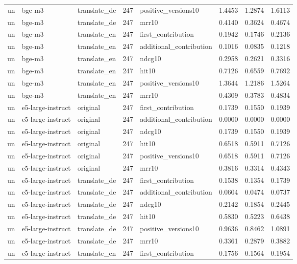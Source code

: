 \begin{tabular}{lllrlrrr}
un & bge-m3 & translate\_de & 247 & positive\_versions10 & 1.4453 & 1.2874 & 1.6113 \\
un & bge-m3 & translate\_de & 247 & mrr10 & 0.4140 & 0.3624 & 0.4674 \\
un & bge-m3 & translate\_en & 247 & first\_contribution & 0.1942 & 0.1746 & 0.2136 \\
un & bge-m3 & translate\_en & 247 & additional\_contribution & 0.1016 & 0.0835 & 0.1218 \\
un & bge-m3 & translate\_en & 247 & ndcg10 & 0.2958 & 0.2621 & 0.3316 \\
un & bge-m3 & translate\_en & 247 & hit10 & 0.7126 & 0.6559 & 0.7692 \\
un & bge-m3 & translate\_en & 247 & positive\_versions10 & 1.3644 & 1.2186 & 1.5264 \\
un & bge-m3 & translate\_en & 247 & mrr10 & 0.4309 & 0.3783 & 0.4834 \\
un & e5-large-instruct & original & 247 & first\_contribution & 0.1739 & 0.1550 & 0.1939 \\
un & e5-large-instruct & original & 247 & additional\_contribution & 0.0000 & 0.0000 & 0.0000 \\
un & e5-large-instruct & original & 247 & ndcg10 & 0.1739 & 0.1550 & 0.1939 \\
un & e5-large-instruct & original & 247 & hit10 & 0.6518 & 0.5911 & 0.7126 \\
un & e5-large-instruct & original & 247 & positive\_versions10 & 0.6518 & 0.5911 & 0.7126 \\
un & e5-large-instruct & original & 247 & mrr10 & 0.3816 & 0.3314 & 0.4343 \\
un & e5-large-instruct & translate\_de & 247 & first\_contribution & 0.1538 & 0.1354 & 0.1739 \\
un & e5-large-instruct & translate\_de & 247 & additional\_contribution & 0.0604 & 0.0474 & 0.0737 \\
un & e5-large-instruct & translate\_de & 247 & ndcg10 & 0.2142 & 0.1854 & 0.2445 \\
un & e5-large-instruct & translate\_de & 247 & hit10 & 0.5830 & 0.5223 & 0.6438 \\
un & e5-large-instruct & translate\_de & 247 & positive\_versions10 & 0.9636 & 0.8462 & 1.0891 \\
un & e5-large-instruct & translate\_de & 247 & mrr10 & 0.3361 & 0.2879 & 0.3882 \\
un & e5-large-instruct & translate\_en & 247 & first\_contribution & 0.1756 & 0.1564 & 0.1954 \\

\end{tabular}
